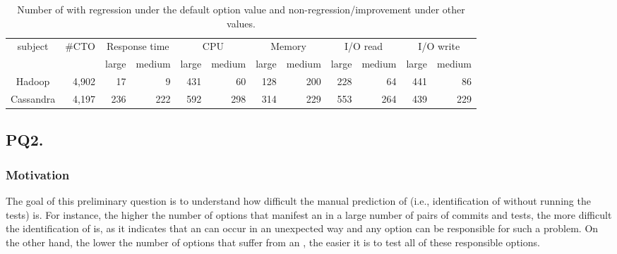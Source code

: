 \begin{table}[t]
\tabcolsep=0.04cm
\caption{Number of \instance with regression under the default option value and  non-regression/improvement under other values.}
    \begin{tabular}{|c|c|c|r|c|r|c|r|c|r|c|r|}
    \hline
    \multirow{2}{*}{subject} & \multirow{2}{*}{\#CTO}    & \multicolumn{2}{c|}{Response time}                     & \multicolumn{2}{c|}{CPU}     & \multicolumn{2}{c|}{Memory}  & \multicolumn{2}{c|}{I/O read}& \multicolumn{2}{c|}{I/O write}   \\ \cline{3-12} 
       & & large                    & \multicolumn{1}{c|}{medium} & large                    & \multicolumn{1}{c|}{medium} & large                    & \multicolumn{1}{c|}{medium} & large                    & \multicolumn{1}{c|}{medium} & large                    & \multicolumn{1}{c|}{medium} \\ \hline
    Hadoop                   & \multicolumn{1}{r|}{4,902} & \multicolumn{1}{r|}{17}  & 9 & \multicolumn{1}{r|}{431} & 60& \multicolumn{1}{r|}{128} & 200   & \multicolumn{1}{r|}{228} & 64& \multicolumn{1}{r|}{441} & 86\\ \hline
    Cassandra                & \multicolumn{1}{r|}{4,197} & \multicolumn{1}{r|}{236} & 222   & \multicolumn{1}{r|}{592} & 298   & \multicolumn{1}{r|}{314} & 229   & \multicolumn{1}{r|}{553} & 264   & \multicolumn{1}{r|}{439} & 229   \\ \hline
    \end{tabular}
\label{tab:option_regression_default}
\end{table}




\subsection*{\textbf{PQ2. \PQII}}

\subsubsection*{Motivation}

The goal of this preliminary question is to understand how difficult the manual prediction of \inconsistent (i.e., identification of \inconsistent without running the tests) is. For instance, the higher the number of options that manifest an \inconsistent in a large number of pairs of commits and tests, the more difficult the identification of \inconsistent is, as it indicates that an \inconsistent can occur in an unexpected way and any option can be responsible for such a problem. On the other hand, the lower the number of options that suffer from an \inconsistent, the easier it is to test all of these \inconsistent responsible options. 

